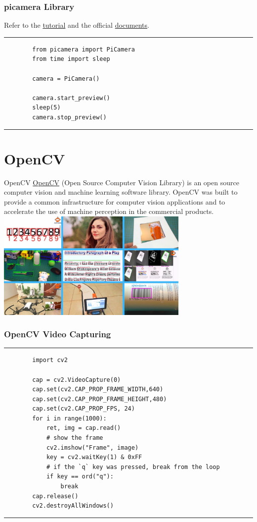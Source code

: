 \documentclass[12pt,letterpaper]{beamer}
\begin{document}
\begin{frame}[fragile]
    \frametitle{picamera Library}
    Refer to the \href{https://projects.raspberrypi.org/en/projects/getting-started-with-picamera}{tutorial} and the official \href{https://picamera.readthedocs.io/en/release-1.13/}{documents}.
    \rule{\textwidth}{1pt}   
    \scriptsize
    \begin{verbatim}
        from picamera import PiCamera
        from time import sleep

        camera = PiCamera()

        camera.start_preview()
        sleep(5)
        camera.stop_preview()
    \end{verbatim}
    \rule{\textwidth}{1pt}   
\end{frame}

\section{OpenCV}

\begin{frame}{OpenCV}
    \href{https://opencv.org/}{OpenCV} (Open Source Computer Vision Library) is an open source computer vision and machine learning software library. 
    OpenCV was built to provide a common infrastructure for computer vision applications and to accelerate the use of machine perception in the commercial products.
    \centering
    \includegraphics[width=0.7\textwidth]{opencv_projects}
\end{frame}

\begin{frame}[fragile]
    \frametitle{OpenCV Video Capturing}
    \rule{\textwidth}{1pt}   
    {\scriptsize
    \begin{verbatim} 
        import cv2

        cap = cv2.VideoCapture(0)
        cap.set(cv2.CAP_PROP_FRAME_WIDTH,640)
        cap.set(cv2.CAP_PROP_FRAME_HEIGHT,480)
        cap.set(cv2.CAP_PROP_FPS, 24)
        for i in range(1000):
            ret, img = cap.read()
            # show the frame
            cv2.imshow("Frame", image)
            key = cv2.waitKey(1) & 0xFF
            # if the `q` key was pressed, break from the loop
            if key == ord("q"):
                break
        cap.release()
        cv2.destroyAllWindows()
    \end{verbatim} 
}
    \rule{\textwidth}{1pt}   
\end{frame}
\end{document}
